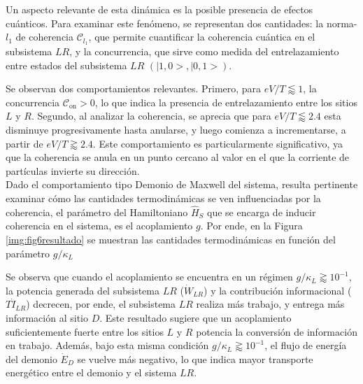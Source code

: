 Un aspecto relevante de esta dinámica es la posible presencia de efectos cuánticos. Para examinar este fenómeno, se representan dos cantidades: la norma-$l_{1}$ de coherencia \( \mathcal{C}_{l_{1}} \), que permite cuantificar la coherencia cuántica en el subsistema \( LR \), y la concurrencia, que sirve como medida del entrelazamiento entre estados del subsistema $LR$ $(|1,0>,|0,1>)$.


Se observan dos comportamientos relevantes. Primero, para \( eV/T \lessapprox 1 \), la concurrencia \( \mathcal{C}_{\text{on}} > 0 \), lo que indica la presencia de entrelazamiento entre los sitios \( L \) y \( R \). Segundo, al analizar la coherencia, se aprecia que para \( eV/T \lessapprox 2.4 \) esta disminuye progresivamente hasta anularse, y luego comienza a incrementarse, a partir de \( eV/T \gtrapprox 2.4 \). Este comportamiento es particularmente significativo, ya que la coherencia se anula en un punto cercano al valor en el que la corriente de partículas invierte su dirección. 
\\

Dado el comportamiento tipo Demonio de Maxwell del sistema, resulta pertinente examinar cómo las cantidades termodinámicas se ven influenciadas por la coherencia, el parámetro del Hamiltoniano $\hat{H}_{S}$ que se encarga de inducir coherencia en el sistema, es el acoplamiento \( g \). Por ende, en la Figura \ref{img:fig6resultado} se muestran las cantidades termodinámicas en función del parámetro \( g/\kappa_{L} \) 


Se observa que cuando el acoplamiento se encuentra en un régimen \( g/\kappa_{L} \gtrapprox 10^{-1}\), la potencia generada del subsistema $LR$ ($\dot{W}_{LR}$) y la contribución informacional ($T\dot{I}_{LR}$) decrecen, por ende, el subsistema $LR$ realiza más trabajo, y entrega más información al sitio $D$. Este resultado sugiere que un acoplamiento suficientemente fuerte entre los sitios $L$ y $R$ potencia la conversión de información en trabajo. 
Además, bajo esta misma condición \( g/\kappa_{L} \gtrapprox 10^{-1} \), el flujo de energía del demonio \( \dot{E}_{D} \) se vuelve más negativo, lo que indica mayor transporte energético entre el demonio y el sistema $LR$.
\\

